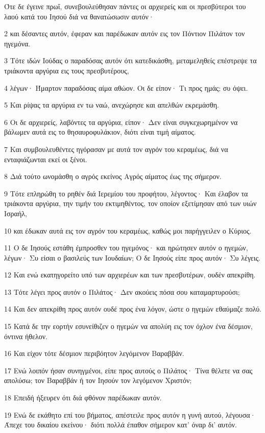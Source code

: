 \par Ότε δε έγεινε πρωΐ, συνεβουλεύθησαν πάντες οι αρχιερείς και οι πρεσβύτεροι του λαού κατά του Ιησού διά να θανατώσωσιν αυτόν·
\par 2 και δέσαντες αυτόν, έφεραν και παρέδωκαν αυτόν εις τον Πόντιον Πιλάτον τον ηγεμόνα.
\par 3 Τότε ιδών Ιούδας ο παραδόσας αυτόν ότι κατεδικάσθη, μεταμεληθείς επέστρεψε τα τριάκοντα αργύρια εις τους πρεσβυτέρους,
\par 4 λέγων· Ήμαρτον παραδόσας αίμα αθώον. Οι δε είπον· Τι προς ημάς; συ όψει.
\par 5 Και ρίψας τα αργύρια εν τω ναώ, ανεχώρησε και απελθών εκρεμάσθη.
\par 6 Οι δε αρχιερείς, λαβόντες τα αργύρια, είπον· Δεν είναι συγκεχωρημένον να βάλωμεν αυτά εις το θησαυροφυλάκιον, διότι είναι τιμή αίματος.
\par 7 Και συμβουλευθέντες ηγόρασαν με αυτά τον αγρόν του κεραμέως, διά να ενταφιάζωνται εκεί οι ξένοι.
\par 8 Διά τούτο ωνομάσθη ο αγρός εκείνος Αγρός αίματος έως της σήμερον.
\par 9 Τότε επληρώθη το ρηθέν διά Ιερεμίου του προφήτου, λέγοντος· Και έλαβον τα τριάκοντα αργύρια, την τιμήν του εκτιμηθέντος, τον οποίον εξετίμησαν από των υιών Ισραήλ,
\par 10 και έδωκαν αυτά εις τον αγρόν του κεραμέως, καθώς μοι παρήγγειλεν ο Κύριος.
\par 11 Ο δε Ιησούς εστάθη έμπροσθεν του ηγεμόνος· και ηρώτησεν αυτόν ο ηγεμών, λέγων· Συ είσαι ο βασιλεύς των Ιουδαίων; Ο δε Ιησούς είπε προς αυτόν· Συ λέγεις.
\par 12 Και ενώ εκατηγορείτο υπό των αρχιερέων και των πρεσβυτέρων, ουδέν απεκρίθη.
\par 13 Τότε λέγει προς αυτόν ο Πιλάτος· Δεν ακούεις πόσα σου καταμαρτυρούσι;
\par 14 Και δεν απεκρίθη προς αυτόν ουδέ προς ένα λόγον, ώστε ο ηγεμών εθαύμαζε πολύ.
\par 15 Κατά δε την εορτήν εσυνείθιζεν ο ηγεμών να απολύη εις τον όχλον ένα δέσμιον, όντινα ήθελον.
\par 16 Και είχον τότε δέσμιον περιβόητον λεγόμενον Βαραββάν.
\par 17 Ενώ λοιπόν ήσαν συνηγμένοι, είπε προς αυτούς ο Πιλάτος· Τίνα θέλετε να σας απολύσω; τον Βαραββάν ή τον Ιησούν τον λεγόμενον Χριστόν;
\par 18 Επειδή ήξευρεν ότι διά φθόνον παρέδωκαν αυτόν.
\par 19 Ενώ δε εκάθητο επί του βήματος, απέστειλε προς αυτόν η γυνή αυτού, λέγουσα· Άπεχε του δικαίου εκείνου· διότι πολλά έπαθον σήμερον κατ' όναρ δι' αυτόν.
